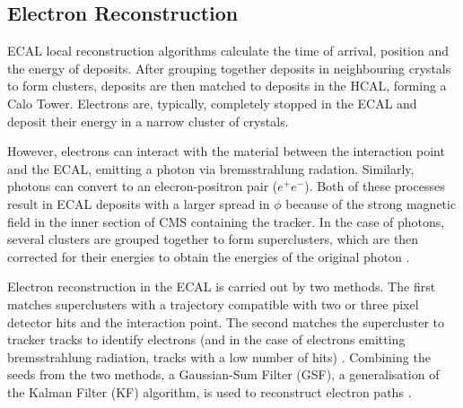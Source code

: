 \subsection{Electron Reconstruction}
\label{ss:electron_reconstruction}
ECAL local reconstruction algorithms calculate the time of arrival, position and the energy of deposits. After
grouping together deposits in neighbouring crystals to form clusters, deposits are then matched to deposits in
the HCAL, forming a Calo Tower. Electrons are, typically, completely stopped in the ECAL and deposit their
energy in a narrow cluster of crystals.

However, electrons can interact with the material between the interaction point and the ECAL, emitting a
photon via bremsstrahlung radation. Similarly, photons can convert to an elecron-positron pair ($e^{+}e^{-}$).
Both of these processes result in ECAL deposits with a larger spread in $\phi$ because of the strong magnetic
field in the inner section of CMS containing the tracker. In the case of photons, several clusters are grouped
together to form superclusters, which are then corrected for their energies to obtain the energies of the
original photon \cite{photon_reconstruction}.

Electron reconstruction in the ECAL is carried out by two methods. The first matches superclusters with a
trajectory compatible with two or three pixel detector hits and the interaction point. The second matches the
supercluster to tracker tracks to identify electrons (and in the case of electrons emitting bremsstrahlung
radiation, tracks with a low number of hits) \cite{electron_reconstruction}. Combining the seeds from the two
methods, a Gaussian-Sum Filter (GSF), a generalisation of the Kalman Filter (KF) algorithm, is used to
reconstruct electron paths \cite{electrons_GSF}.

